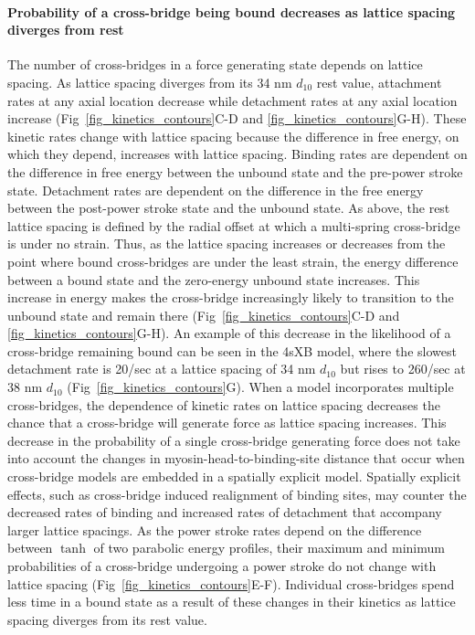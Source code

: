 \documentclass[10pt]{article}
\begin{document}
\paragraph{Probability of a cross-bridge being bound decreases as lattice spacing diverges from rest} %
The number of cross-bridges in a force generating state depends on lattice spacing. 
As lattice spacing diverges from its 34 nm $d_{10}$ rest value, attachment rates at any axial location decrease while detachment rates at any axial location increase (Fig~\ref{fig_kinetics_contours}C-D and \ref{fig_kinetics_contours}G-H). 
These kinetic rates change with lattice spacing because the difference in free energy, on which they depend, increases with lattice spacing.
Binding rates are dependent on the difference in free energy between the unbound state and the pre-power stroke state.  
Detachment rates are dependent on the difference in the free energy between the post-power stroke state and the unbound state.  
As above, the rest lattice spacing is defined by the radial offset at which a multi-spring cross-bridge is under no strain. 
Thus, as the lattice spacing increases or decreases from the point where bound cross-bridges are under the least strain, the energy difference between a bound state and the zero-energy unbound state increases. 
This increase in energy makes the cross-bridge increasingly likely to transition to the unbound state and remain there (Fig~\ref{fig_kinetics_contours}C-D and  \ref{fig_kinetics_contours}G-H). 
An example of this decrease in the likelihood of a cross-bridge remaining bound can be seen in the 4sXB model, where the slowest detachment rate is 20/sec at a lattice spacing of 34 nm $d_{10}$ but rises to 260/sec at 38 nm $d_{10}$ (Fig~\ref{fig_kinetics_contours}G). 
When a model incorporates multiple cross-bridges, the dependence of kinetic rates on lattice spacing decreases the chance that a cross-bridge will generate force as lattice spacing increases.
This decrease in the probability of a single cross-bridge generating force does not take into account the changes in myosin-head-to-binding-site distance that occur when cross-bridge models are embedded in a spatially explicit model. 
Spatially explicit effects, such as cross-bridge induced realignment of binding sites, may counter the decreased rates of binding and increased rates of detachment that accompany larger lattice spacings.
As the power stroke rates depend on the difference between $\tanh$ of two parabolic energy profiles, their maximum and minimum probabilities of a cross-bridge undergoing a power stroke do not change with lattice spacing (Fig~\ref{fig_kinetics_contours}E-F). 
Individual cross-bridges spend less time in a bound state as a result of these changes in their kinetics as lattice spacing diverges from its rest value.
\end{document}
